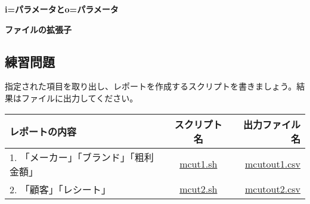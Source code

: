 {\setlength{\parindent}{0cm}
\textbf{i=パラメータとo=パラメータ}\\


\vspace {5mm}

\textbf{ファイルの拡張子}\\

}

\newpage
\subsection{練習問題}

指定された項目を取り出し、レポートを作成するスクリプトを書きましょう。結果はファイルに出力してください。

\begin{table}[htbp]
{\small
\begin{tabular}{ l | c || r }
\hline
\textbf{レポートの内容}   & \textbf{スクリプト名} & \textbf{出力ファイル名}  \\
\hline
1. 「メーカー」「ブランド」「粗利金額」 & \href{exercise/mcut1.sh}{mcut1.sh} & \href{exercise/outdat/mcutout1.csv}{mcutout1.csv} \\
2. 「顧客」「レシート」 & \href{exercise/mcut2.sh}{mcut2.sh} & \href{exercise/outdat/mcutout2.csv}{mcutout2.csv} \\
\hline
\end{tabular} 
}
\end{table} 


%
